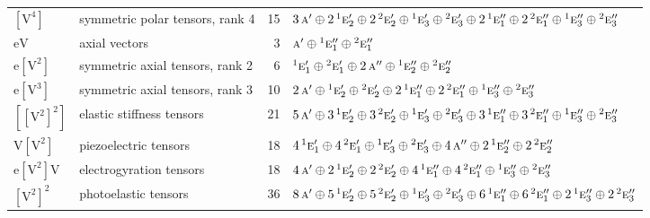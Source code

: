 \documentclass[10pt,a4paper]{article}
\numberwithin{equation}{section}
\newcommand{\irr}[1]{\text{\normalfont\scshape #1}}
\newcommand{\conjpair}[1]{{}^{#1}}
\newcommand{\jahn}[1]{\mathrm{#1}}
\newlength{\fillwidth}\newlength{\cellwidth}\newlength{\colwidth}
\begin{document}
{\begin{longtable}{@{}llr>{\RaggedRight\arraybackslash}p{\fillwidth}@{}}
$\jahn{[V^{4}]}$ & symmetric polar tensors, rank 4 & 15 & $3\,\irr{a}' \oplus\allowbreak 2\,\conjpair{1}\irr{e}_{2}' \oplus\allowbreak 2\,\conjpair{2}\irr{e}_{2}' \oplus\allowbreak \conjpair{1}\irr{e}_{3}' \oplus\allowbreak \conjpair{2}\irr{e}_{3}' \oplus\allowbreak 2\,\conjpair{1}\irr{e}_{1}'' \oplus\allowbreak 2\,\conjpair{2}\irr{e}_{1}'' \oplus\allowbreak \conjpair{1}\irr{e}_{3}'' \oplus\allowbreak \conjpair{2}\irr{e}_{3}''$\\
$\jahn{eV}$ & axial vectors & 3 & $\irr{a}' \oplus\allowbreak \conjpair{1}\irr{e}_{1}'' \oplus\allowbreak \conjpair{2}\irr{e}_{1}''$\\
$\jahn{e[V^{2}]}$ & symmetric axial tensors, rank 2 & 6 & $\conjpair{1}\irr{e}_{1}' \oplus\allowbreak \conjpair{2}\irr{e}_{1}' \oplus\allowbreak 2\,\irr{a}'' \oplus\allowbreak \conjpair{1}\irr{e}_{2}'' \oplus\allowbreak \conjpair{2}\irr{e}_{2}''$\\
$\jahn{e[V^{3}]}$ & symmetric axial tensors, rank 3 & 10 & $2\,\irr{a}' \oplus\allowbreak \conjpair{1}\irr{e}_{2}' \oplus\allowbreak \conjpair{2}\irr{e}_{2}' \oplus\allowbreak 2\,\conjpair{1}\irr{e}_{1}'' \oplus\allowbreak 2\,\conjpair{2}\irr{e}_{1}'' \oplus\allowbreak \conjpair{1}\irr{e}_{3}'' \oplus\allowbreak \conjpair{2}\irr{e}_{3}''$\\
$\jahn{[[V^{2}]^{2}]}$ & elastic stiffness tensors & 21 & $5\,\irr{a}' \oplus\allowbreak 3\,\conjpair{1}\irr{e}_{2}' \oplus\allowbreak 3\,\conjpair{2}\irr{e}_{2}' \oplus\allowbreak \conjpair{1}\irr{e}_{3}' \oplus\allowbreak \conjpair{2}\irr{e}_{3}' \oplus\allowbreak 3\,\conjpair{1}\irr{e}_{1}'' \oplus\allowbreak 3\,\conjpair{2}\irr{e}_{1}'' \oplus\allowbreak \conjpair{1}\irr{e}_{3}'' \oplus\allowbreak \conjpair{2}\irr{e}_{3}''$\\
$\jahn{V[V^{2}]}$ & piezoelectric tensors & 18 & $4\,\conjpair{1}\irr{e}_{1}' \oplus\allowbreak 4\,\conjpair{2}\irr{e}_{1}' \oplus\allowbreak \conjpair{1}\irr{e}_{3}' \oplus\allowbreak \conjpair{2}\irr{e}_{3}' \oplus\allowbreak 4\,\irr{a}'' \oplus\allowbreak 2\,\conjpair{1}\irr{e}_{2}'' \oplus\allowbreak 2\,\conjpair{2}\irr{e}_{2}''$\\
$\jahn{e[V^{2}]V}$ & electrogyration tensors & 18 & $4\,\irr{a}' \oplus\allowbreak 2\,\conjpair{1}\irr{e}_{2}' \oplus\allowbreak 2\,\conjpair{2}\irr{e}_{2}' \oplus\allowbreak 4\,\conjpair{1}\irr{e}_{1}'' \oplus\allowbreak 4\,\conjpair{2}\irr{e}_{1}'' \oplus\allowbreak \conjpair{1}\irr{e}_{3}'' \oplus\allowbreak \conjpair{2}\irr{e}_{3}''$\\
$\jahn{[V^{2}]^{2}}$ & photoelastic tensors & 36 & $8\,\irr{a}' \oplus\allowbreak 5\,\conjpair{1}\irr{e}_{2}' \oplus\allowbreak 5\,\conjpair{2}\irr{e}_{2}' \oplus\allowbreak \conjpair{1}\irr{e}_{3}' \oplus\allowbreak \conjpair{2}\irr{e}_{3}' \oplus\allowbreak 6\,\conjpair{1}\irr{e}_{1}'' \oplus\allowbreak 6\,\conjpair{2}\irr{e}_{1}'' \oplus\allowbreak 2\,\conjpair{1}\irr{e}_{3}'' \oplus\allowbreak 2\,\conjpair{2}\irr{e}_{3}''$\\

\end{longtable}}
\end{document}
